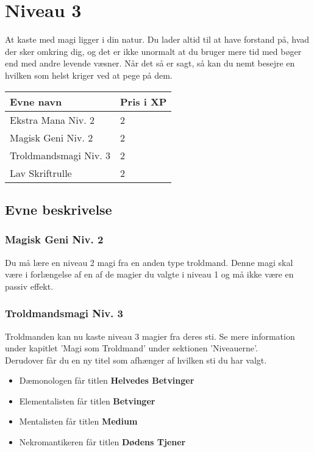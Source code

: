 \chapter{Niveau 3}
At kaste med magi ligger i din natur. Du lader altid til at have forstand på, hvad der sker omkring dig, og det er ikke unormalt at du bruger mere tid med bøger end med andre levende væsner. Når det så er sagt, så kan du nemt besejre en hvilken som helst kriger ved at pege på dem.

\begin{table}[H]
    \centering
    \begin{tabular}{|p{}|p{}|}
    \rowcolor{cerulean!80}\hline
        Evne navn & Pris i XP \\\hline
        Ekstra Mana Niv. 2 & 2\\\hline 
        Magisk Geni Niv. 2 & 2 \\\hline
        Troldmandsmagi Niv. 3 & 2\\\hline
        Lav Skriftrulle & 2 \\\hline
    \end{tabular}
\end{table}
\section*{Evne beskrivelse}



\subsection{Magisk Geni Niv. 2}
Du må lære en niveau 2 magi fra en anden type troldmand. Denne magi skal være i forlængelse af en af de magier du valgte i niveau 1 og må ikke være en passiv effekt.

\subsection{Troldmandsmagi Niv. 3}
Troldmanden kan nu kaste niveau 3 magier fra deres sti. Se mere information under kapitlet 'Magi som Troldmand' under sektionen 'Niveauerne'. \\
Derudover får du en ny titel som afhænger af hvilken sti du har valgt.\\
\begin{itemize}
    \item Dæmonologen får titlen \textbf{Helvedes Betvinger}
    \item Elementalisten får titlen \textbf{Betvinger}
    \item Mentalisten får titlen \textbf{Medium}
    \item Nekromantikeren får titlen \textbf{Dødens Tjener}
\end{itemize}

